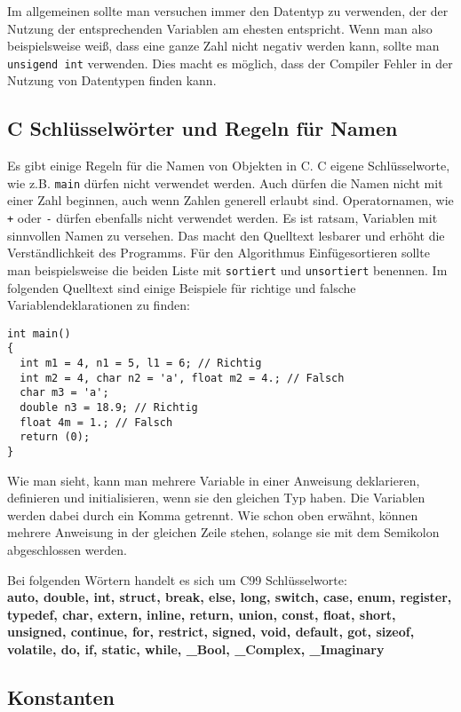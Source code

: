 Im allgemeinen sollte man versuchen immer den Datentyp zu verwenden, der der Nutzung der entsprechenden Variablen am ehesten entspricht.
Wenn man also beispielsweise weiß, dass eine ganze Zahl nicht negativ werden kann, sollte man \texttt{unsigend int} verwenden.
Dies macht es möglich, dass der Compiler Fehler in der Nutzung von Datentypen finden kann.

\subsection{C Schlüsselwörter und Regeln für Namen}

Es gibt einige Regeln für die Namen von Objekten in C. 
C eigene Schlüsselworte, wie z.B. \texttt{main} dürfen nicht verwendet werden.
Auch dürfen die Namen nicht mit einer Zahl beginnen, auch wenn Zahlen generell erlaubt sind.
Operatornamen, wie \verb|+| oder \verb|-| dürfen ebenfalls nicht verwendet werden.
Es ist ratsam, Variablen mit sinnvollen Namen zu versehen.
Das macht den Quelltext lesbarer und erhöht die Verständlichkeit des Programms.
Für den Algorithmus Einfügesortieren sollte man beispielsweise die beiden Liste mit \texttt{sortiert} und \texttt{unsortiert} benennen.
Im folgenden Quelltext sind einige Beispiele für richtige und falsche Variablendeklarationen zu finden:
\begin{lstlisting}
int main()
{
  int m1 = 4, n1 = 5, l1 = 6; // Richtig
  int m2 = 4, char n2 = 'a', float m2 = 4.; // Falsch
  char m3 = 'a';
  double n3 = 18.9; // Richtig
  float 4m = 1.; // Falsch
  return (0);
}
\end{lstlisting} 
Wie man sieht, kann man mehrere Variable in einer Anweisung deklarieren, definieren und initialisieren, wenn sie den gleichen Typ haben.
Die Variablen werden dabei durch ein Komma getrennt.
Wie schon oben erwähnt, können mehrere Anweisung in der gleichen Zeile stehen, solange sie mit dem Semikolon abgeschlossen werden.

Bei folgenden Wörtern handelt es sich um C99 Schlüsselworte:\\
\textbf{auto, double, int, struct, break, else, long, switch, case,
  enum, register, typedef, char, extern, inline, return, union, const, float,
  short, unsigned, continue, for, restrict, signed, void, default, got, sizeof,
  volatile, do, if, static, while, \_Bool, \_Complex, \_Imaginary}

\subsection{Konstanten}

